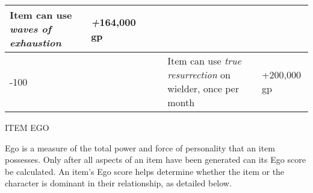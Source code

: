 \begin{longtable}{llllll}
{\begin{minipage}[t]{0.473in}
Item can use \textit{waves of exhaustion}\end{minipage}} & \multicolumn{1}{p{2.825in}|}{\begin{minipage}[t]{2.825in}\raggedleft
\textit{+}164,000 gp\end{minipage}}\\
\hline
\multicolumn{4}{p{1.203in}|}{\begin{minipage}[t]{1.203in}\centering
99-100\end{minipage}} & \multicolumn{1}{|p{0.473in}|}{\begin{minipage}[t]{0.473in}\centering
Item can use \textit{true resurrection }on wielder, once per month\end{minipage}} & \multicolumn{1}{p{2.825in}|}{\begin{minipage}[t]{2.825in}\raggedleft
+200,000 gp\end{minipage}}\\
\hline
\end{longtable}

\vspace{12pt}
ITEM EGO

Ego is a measure of the total power and force of personality that an item possesses. 
Only after all aspects of an item have been generated can its Ego score be calculated. 
An item's Ego score helps determine whether the item or the character is dominant 
in their relationship, as detailed below.

